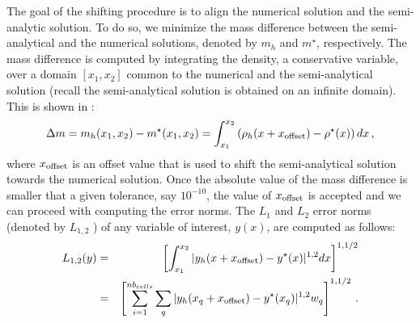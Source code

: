 \documentclass[times,doublespace]{fldauth}%
\begin{document}
The goal of the shifting procedure is to align the numerical solution and the semi-analytic solution.
To do so, we minimize the mass difference between the semi-analytical and the numerical solutions, denoted by $m_h$ and $m^\star$, respectively.
The mass difference is computed by integrating the density, a conservative variable, over a domain $[x_1, x_2]$ common to the numerical and the semi-analytical solution (recall the semi-analytical solution is obtained on an infinite domain).
This is shown in :
%
\begin{equation}\label{eq:mass-diff}
\Delta m = m_h(x_1,x_2) - m^\star(x_1,x_2) = \int_{x_1}^{x_2} \left( \rho_h (x+x_{\text{\text{offset}}}) - \rho^\star (x)\right) dx \, ,
\end{equation}
%
where $x_{\text{\text{offset}}}$ is an offset value that is used to shift the semi-analytical solution towards the numerical solution. Once the absolute value of the mass difference is smaller that a given tolerance, say $10^{-10}$, the value of $x_{\text{\text{offset}}}$ is accepted and we can proceed with computing the error norms. The $L_{1}$ and $L_{2}$ error norms (denoted by $L_{1,2}$ ) of any variable of interest, $y(x)$, are computed as follows:
%
\begin{eqnarray}\label{eq:l1-error-norm}
L_{1,2}(y) &=& \left[ \int_{x_1}^{x_2} | y_h(x+x_{\text{\text{offset}}}) - y^\star(x) |^{1,2} dx \right]^{1,1/2} \nonumber \\ 
&=& \left[ \sum_{i=1}^{nb_{cells}} \sum_{q} | y_h(x_q+x_{\text{\text{offset}}}) - y^\star(x_q) |^{1,2} w_q \right]^{1,1/2} \, .
\end{eqnarray}
%
\end{document}
